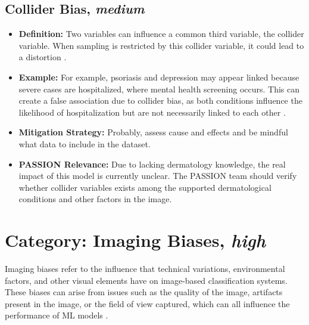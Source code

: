 \documentclass[12pt, a4paper, oneside]{book}   	%
\begin{document}
\begin{appendices}
		\subsection{Collider Bias, \textit{medium}}
		\begin{itemize}
			\item \textbf{Definition:} Two variables can influence a common third variable, the collider variable. When sampling is restricted by this collider variable, it could lead to a distortion \autocite{c4, c8, c9, Chakraborty_2024}.
			\item \textbf{Example:} For example, psoriasis and depression may appear linked because severe cases are hospitalized, where mental health screening occurs. This can create a false association due to collider bias, as both conditions influence the likelihood of hospitalization but are not necessarily linked to each other \autocite{Chakraborty_2024}.
			\item \textbf{Mitigation Strategy:} Probably, assess cause and effects and be mindful what data to include in the dataset.
			\item \textbf{PASSION Relevance:} Due to lacking dermatology knowledge, the real impact of this model is currently unclear. The PASSION team should verify whether collider variables exists among the supported dermatological conditions and other factors in the image.
		\end{itemize}
		
		\section{Category: Imaging Biases, \textit{high}} \label{biasCategoryImagingBiasesHigh}
		Imaging biases refer to the influence that technical variations, environmental factors, and other visual elements have on image-based classification systems. These biases can arise from issues such as the quality of the image, artifacts present in the image, or the field of view captured, which can all influence the performance of \gls{ML} models \autocite{Young_2020}.
		

\end{appendices}
\end{document}
